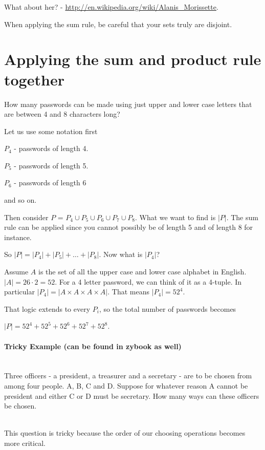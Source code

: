 \documentclass[12pt]{article}
\begin{document}
What about her? - \href{http://en.wikipedia.org/wiki/Alanis\_Morissette}{http://en.wikipedia.org/wiki/Alanis\_Morissette}.

When applying the sum rule, be careful that your sets truly are disjoint.

\section*{Applying the sum and product rule together}

How many passwords can be made using just upper and lower case letters that are between 4 and 8 characters long?

Let us use some notation first

$P_4$ - passwords of length 4.

$P_5$ - passwords of length 5.

$P_6$ - passwords of length 6

and so on.

Then consider $P$ = $P_4 \cup P_5 \cup P_6 \cup P_7 \cup P_8$. What we want to find is $|P|$. The sum rule can be applied since you cannot possibly be of length 5 and of length 8 for instance.

So $|P| = |P_4| + |P_5| + \ldots + |P_8|$. Now what is $|P_4|$?

Assume $A$ is the set of all the upper case and lower case alphabet in English. $|A| = 26 \cdot 2=52$. For a 4 letter password, we can think of it as a 4-tuple. In particular $|P_4| = |A \times A \times A \times A|$.
That means $|P_4| = 52^4$.

That logic extends to every $P_i$, so the total number of passwords becomes

$|P| = 52^4 + 52^5 + 52^6 + 52^7 + 52^8$.

\paragraph{Tricky Example (can be found in zybook as well)}~\\

Three officers - a president, a treasurer and a secretary - are to be chosen from among four people. A, B, C and D. Suppose for whatever reason A cannot be president and either C or D must be secretary. How many ways can these officers be chosen.

~\\
This question is tricky because the order of our choosing operations becomes more critical. 
\end{document}
